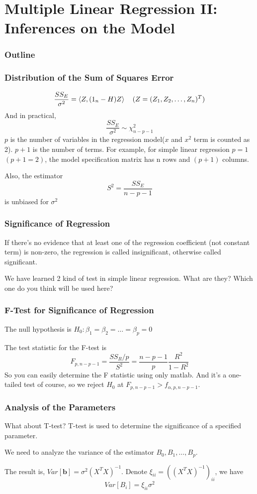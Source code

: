 \documentclass{beamer}
\begin{document}
\section{Multiple Linear Regression II: Inferences on the Model}
\begin{frame}
    \frametitle{Outline}
    \tableofcontents[currentsection]
\end{frame}
\begin{frame}
    \frametitle{Distribution of the Sum of Squares Error}

    \[\frac{SS_E}{\sigma^2}=\Braket{Z,(1_n-H)Z}\quad(Z=(Z_1,Z_2,\dots , Z_n)^{T})\]
    And in practical,
    \[\frac{SS_E}{\sigma^2}\sim \chi^2_{n-p-1}\]
    $p$ is the number of variables in the regression model($x$ and $x^2$ term is counted as 2). $p+1$ is the number of terms. For example, for simple linear regression $p=1$ $(p+1=2)$, the model specification matrix has n rows and $(p+1)$ columns.\par
    Also, the estimator 
    \[S^2=\frac{SS_E}{n-p-1}\]
    is unbiased for $\sigma^2$

\end{frame}

\begin{frame}
    \frametitle{Significance of Regression}

    If there's no evidence that at least one of the regression coefficient (not constant term) is non-zero, the regression is called insignificant, otherwise called significant. \par
    We have learned 2 kind of test in simple linear regression. What are they? Which one do you think will be used here?

\end{frame}

\begin{frame}
    \frametitle{F-Test for Significance of Regression}
    The null hypothesis is $H_0: \beta_1=\beta_2=\dots  =\beta_p=0$\par
    The test statistic for the F-test is 
    \[F_{p,n-p-1}=\frac{SS_R/p}{S^2}=\frac{n-p-1}{p}\frac{R^2}{1-R^2}\]
    So you can easily determine the F statistic using only matlab. And it's a one-tailed test of course, so we reject $H_0$ at $F_{p,n-p-1}>f_{\alpha, p,n-p-1}$.\par


\end{frame}

\begin{frame}
    \frametitle{Analysis of the Parameters}
    What about T-test? T-test is used to determine the significance of a specified parameter. \par
    We need to analyze the variance of the estimator $B_0, B_1, \dots , B_p$.\par
    The result is, $Var[\textbf{b}]=\sigma^2(X^{T}X)^{-1}$. Denote $\xi_{ii}=((X^{T}X)^{-1})_{ii}$, we have 
    \[Var[B_i]=\xi_{ii}\sigma^2\]
    

\end{frame}
\end{document}

